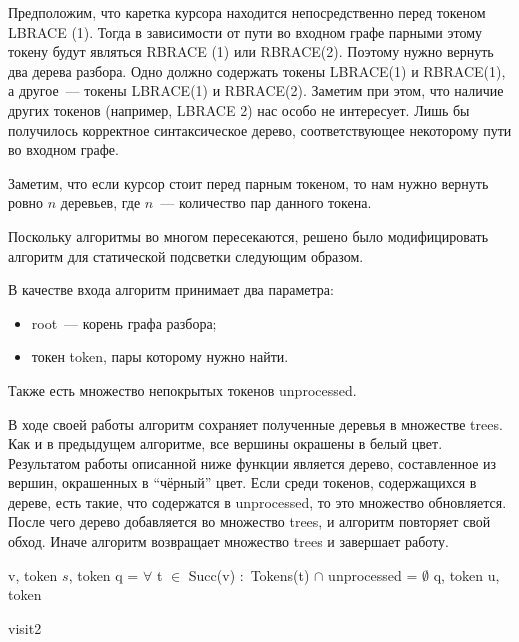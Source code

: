 Предположим, что каретка курсора находится непосредственно перед токеном LBRACE (1). Тогда в зависимости от пути во входном графе парными этому токену будут являться RBRACE (1) или RBRACE(2). Поэтому нужно вернуть два дерева разбора. Одно должно содержать токены LBRACE(1) и RBRACE(1), а другое~--- токены LBRACE(1) и RBRACE(2). Заметим при этом, что наличие других токенов (например, LBRACE 2) нас особо не интересует. Лишь бы получилось корректное синтаксическое дерево, соответствующее некоторому пути во входном графе.

Заметим, что если курсор стоит перед парным токеном, то нам нужно вернуть ровно $n$ деревьев, где $n$~--- количество пар данного токена. 

Поскольку алгоритмы во многом пересекаются, решено было модифицировать алгоритм для статической подсветки следующим образом. 

В качестве входа алгоритм принимает два параметра:
\begin{itemize}
\item root~--- корень графа разбора;
\item токен token, пары которому нужно найти.
\end{itemize}

Также есть множество непокрытых токенов unprocessed.

В ходе своей работы алгоритм сохраняет полученные деревья в множестве trees. Как и в предыдущем алгоритме, все вершины окрашены в белый цвет. Результатом работы описанной ниже функции является дерево, составленное из вершин, окрашенных в ``чёрный'' цвет. Если среди токенов, содержащихся в дереве, есть такие, что содержатся в unprocessed, то это множество обновляется. После чего дерево добавляется во множество trees, и алгоритм повторяет свой обход. Иначе алгоритм возвращает множество trees и завершает работу. 

\begin{algorithm}
\begin{algorithmic}[1]
 {v, token}
    \State {}
        \State {} {$s$, token}
        \Else 
            \State q = $\forall$ t $\in$ Succ(v) $\colon$ Tokens(t) $\cap$ unprocessed = $\emptyset$
            \State {} {q, token}
        \EndIf
    \EndIf
\Else 
        \State {} {u, token}
    \EndFor
\EndIf 
{}
\EndFunction

\end{algorithmic}
\caption{visit2}
\end{algorithm}

